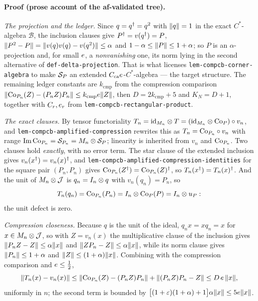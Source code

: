 \paragraph{Proof (prose account of the af-validated tree).}
\emph{The projection and the ledger.} Since $q=q^{\dagger}=q^{2}$ with $\lVert q\rVert=1$ in the exact
$C^*$-algebra $\mathcal B$, the inclusion clauses give $P^{\dagger}=v(q^{\dagger})=P$,
$\lVert P^{2}-P\rVert=\lVert v(q)v(q)-v(q^{2})\rVert\le\alpha$ and $1-\alpha\le\lVert P\rVert\le1+\alpha$; so
$P$ is an $\alpha$-projection and, for small $e$, a \emph{nonvanishing} one, its norm
lying in the second alternative of \texttt{def-delta-projection}. That is what licenses
\texttt{lem-compcb-corner-algebra} to make $\mathcal S_{P}$ an extended
$C_{\mathrm{ca}}e$-$C^*$-algebra --- the target structure. The remaining ledger
constants are $k_{\mathrm{cmp}}$ from the compression comparison
$\lVert \mathrm{Co}_{P_n}(Z)-(P_nZ)P_n\rVert\le k_{\mathrm{cmp}}e\lVert Z\rVert$, then $D=2k_{\mathrm{cmp}}+5$
and $K_N=D+1$, together with $C_r,e_r$ from
\texttt{lem-compcb-rectangular-product}.

\emph{The exact clauses.} By tensor functoriality
$T_n=\mathrm{id}_{M_{n}}\otimes T=(\mathrm{id}_{M_{n}}\otimes\mathrm{Co}_{P})\circ v_n$, and
\texttt{lem-compcb-amplified-compression} rewrites this as $T_n=\mathrm{Co}_{P_n}\circ v_n$ with
range $\operatorname{Im}\mathrm{Co}_{P_n}=\mathcal S_{P_n}=M_{n}\otimes \mathcal S_{P}$; linearity is inherited from $v_n$ and
$\mathrm{Co}_{P_n}$. Two clauses hold \emph{exactly}, with no error term. The star clause of the
extended inclusion gives $v_n(x^{\dagger})=v_n(x)^{\dagger}$, and
\texttt{lem-compcb-amplified-compression-identities} for the square pair $(P_n,P_n)$ gives
$\mathrm{Co}_{P_n}(Z^{\dagger})=\mathrm{Co}_{P_n}(Z)^{\dagger}$, so $T_n(x^{\dagger})=T_n(x)^{\dagger}$. And the unit of
$M_{n}\otimes \mathcal J$ is $q_n=I_{n}\otimes q$ with $v_n(q_n)=P_n$, so
\[
  T_n(q_n)=\mathrm{Co}_{P_n}(P_n)=I_{n}\otimes \mathrm{Co}_{P}(P)=I_{n}\otimes u_{P} :
\]
the unit defect is zero.

\emph{Compression closeness.} Because $q$ is the unit of the ideal, $q_nx=xq_n=x$ for
$x\in M_{n}\otimes \mathcal J$, so with $Z=v_n(x)$ the multiplicative clause of the inclusion
gives $\lVert P_nZ-Z\rVert\le\alpha\lVert x\rVert$ and $\lVert ZP_n-Z\rVert\le\alpha\lVert x\rVert$, while its norm
clause gives $\lVert P_n\rVert\le1+\alpha$ and $\lVert Z\rVert\le(1+\alpha)\lVert x\rVert$. Combining with the
compression comparison and $e\le\tfrac12$,
\begin{equation}\label{eq:sct-close}
  \lVert T_n(x)-v_n(x)\rVert
  \le\lVert \mathrm{Co}_{P_n}(Z)-(P_nZ)P_n\rVert+\lVert (P_nZ)P_n-Z\rVert
  \le D\,e\,\lVert x\rVert,
\end{equation}
uniformly in $n$; the second term is bounded by
$\bigl[(1+\varepsilon)(1+\alpha)+1\bigr]\alpha\lVert x\rVert\le5e\lVert x\rVert$.

